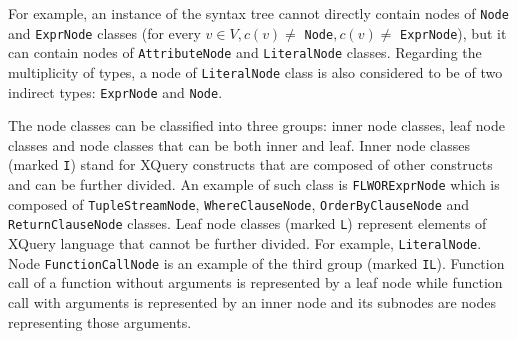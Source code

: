For example, an instance of the syntax tree cannot directly contain nodes of \texttt{Node} and \texttt{ExprNode} classes (for every $v \in V, c(v) \neq$ \texttt{Node}$, c(v) \neq$ \texttt{ExprNode}), but it can contain nodes of \texttt{AttributeNode} and \texttt{LiteralNode} classes. Regarding the multiplicity of types, a node of \texttt{LiteralNode} class is also considered to be of two indirect types: \texttt{ExprNode} and \texttt{Node}.

The node classes can be classified into three groups: inner node classes, leaf node classes and node classes that can be both inner and leaf. Inner node classes (marked \texttt{I}) stand for XQuery constructs that are composed of other constructs and can be further divided. An example of such class is \texttt{FLWORExprNode} which is composed of \texttt{TupleStreamNode}, \texttt{WhereClauseNode}, \texttt{OrderByClauseNode} and \texttt{ReturnClauseNode} classes. Leaf node classes (marked \texttt{L}) represent elements of XQuery language that cannot be further divided. For example, \texttt{LiteralNode}. Node \texttt{FunctionCallNode} is an example of the third group (marked \texttt{IL}). Function call of a function without arguments is represented by a leaf node while function call with arguments is represented by an inner node and its subnodes are nodes representing those arguments.

